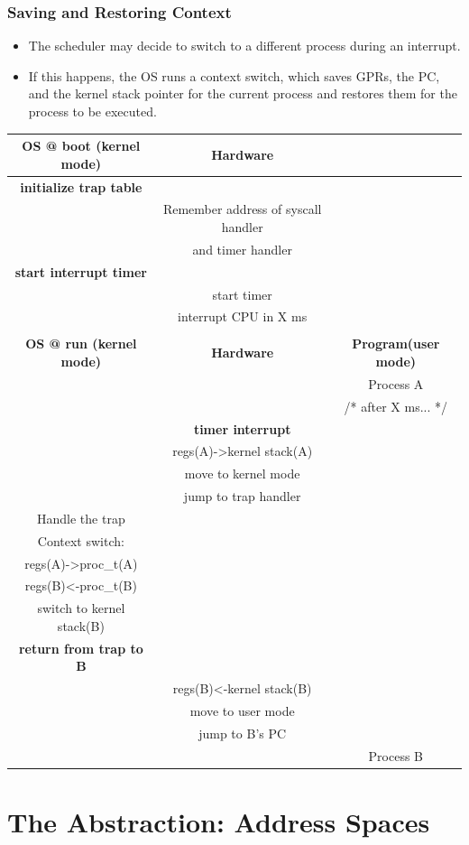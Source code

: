 \documentclass[11pt, a4paper]{article}
\theoremstyle{definition}
\theoremstyle{remark}
\newcommand{\chap}[2]{%
  \renewcommand{\thesection}{\arabic{section}}%
  \renewcommand{\theHsection}{chap.\arabic{section}}%
  \setcounter{section}{#1}\addtocounter{section}{-1}%
  \section{#2}}
\begin{document}
\subsubsection{Saving and Restoring Context}
\begin{itemize}
  \item The scheduler may decide to switch to a different process during an interrupt. 
  \item If this happens, the OS runs a context switch, which saves GPRs, the PC, and the kernel stack pointer for the current process and restores them for the process to be executed.
\end{itemize}
\begin{center}
\small
\begin{tabular}{c c c}
\textbf{OS @ boot (kernel mode)} & \textbf{Hardware} & \\
\hline 
\textbf{initialize trap table} & &  \\ 
& Remember address of syscall handler & \\ 
& and timer handler & \\
\textbf{start interrupt timer} & & \\
& start timer & \\
& interrupt CPU in X ms & \\
\\
\textbf{OS @ run (kernel mode)} & \textbf{Hardware} & \textbf{Program(user mode)} \\
\hline 
& & Process A \\
& & /* after X ms... */ \\ 
& \textbf{timer interrupt} & \\ 
& regs(A)->kernel stack(A) & \\ 
& move to kernel mode & \\ 
& jump to trap handler & \\ 
Handle the trap & & \\ 
Context switch: & & \\ 
  regs(A)->proc\_t(A) & & \\
  regs(B)<-proc\_t(B) & & \\
  switch to kernel stack(B) & & \\
\textbf{return from trap to B} & & \\
& regs(B)<-kernel stack(B) & \\ 
& move to user mode & \\
& jump to B's PC & \\
& & Process B \\
\end{tabular}
\end{center}
\chap{13}{The Abstraction: Address Spaces}
\end{document}
